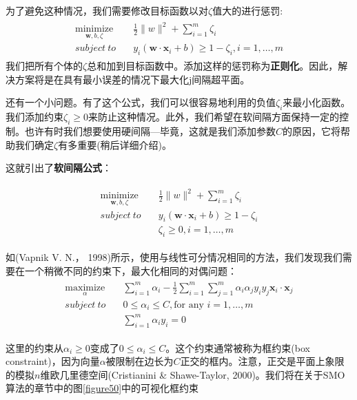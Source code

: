 为了避免这种情况，我们需要修改目标函数以对$\zeta$值大的进行惩罚:
\begin{gather*}
\begin{align*}
\underset{\mathbf{w},b,\zeta}{\text{minimize}} \quad &\frac{1}{2}\|w\|^2 + \sum_{i=1}^m \zeta_i \\
subject\ to\quad &y_i(\mathbf{w}\cdot\mathbf{x}_i+b) \geq 1 - \zeta_i,i=1,\dots,m
\end{align*}
\end{gather*}
我们把所有个体的$\zeta$总和加到目标函数中。添加这样的惩罚称为\textbf{正则化}。因此，解决方案将是在具有最小误差的情况下最大化j间隔超平面。

还有一个小问题。有了这个公式，我们可以很容易地利用的负值$\zeta_i$来最小化函数。我们添加约束$\zeta_i \geq 0$来防止这种情况。此外，我们希望在软间隔方面保持一定的控制。也许有时我们想要使用硬间隔—毕竟，这就是我们添加参数$C$的原因，它将帮助我们确定$\zeta$有多重要(稍后详细介绍)。

这就引出了\textbf{软间隔公式}：

\begin{gather*}
\begin{align*}
\underset{\mathbf{w},b,\zeta}{\text{minimize}} \quad &\frac{1}{2}\|w\|^2 + \sum_{i=1}^m \zeta_i \\
subject\ to\quad &y_i(\mathbf{w}\cdot\mathbf{x}_i+b) \geq 1 - \zeta_i \\
& \zeta_i \geq 0,i=1,\dots,m
\end{align*}
\end{gather*}

如(Vapnik V. N.， 1998)所示，使用与线性可分情况相同的方法，我们发现我们需要在一个稍微不同的约束下，最大化相同的对偶问题：
\begin{gather*}
\begin{align*}
\underset{\alpha}{\text{maximize}} \quad & \sum_{i=1}^m \alpha_i - \frac{1}{2}\sum_{i=1}^m\sum_{j=1}^m \alpha_i \alpha_j y_i y_j \mathbf{x}_i \cdot \mathbf{x}_j  \\
subject\ to \quad & 0 \leq \alpha_i \leq C,\text{for any }i=1,\dots,m \\
& \sum_{i=1}^m \alpha_i y_i = 0
\end{align*}
\end{gather*}

这里的约束从$\alpha_i \geq 0$变成了$0 \leq \alpha_i \leq C$。这个约束通常被称为框约束(box constraint)，因为向量$\alpha$被限制在边长为$C$正交的框内。注意，正交是平面上象限的模拟$n$维欧几里德空间(Cristianini \& Shawe-Taylor, 2000)。我们将在关于SMO算法的章节中的图\ref{figure50}中的可视化框约束

